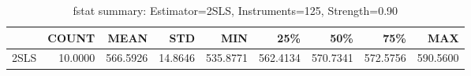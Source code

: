 \begin{table}[ht]
\centering
\caption{fstat summary: Estimator=2SLS, Instruments=125, Strength=0.90}
\begin{tabular}{lrrrrrrrr}
\toprule
 & COUNT & MEAN & STD & MIN & 25\% & 50\% & 75\% & MAX \\
\midrule
2SLS & 10.0000 & 566.5926 & 14.8646 & 535.8771 & 562.4134 & 570.7341 & 572.5756 & 590.5600 \\
\bottomrule
\end{tabular}
\end{table}
